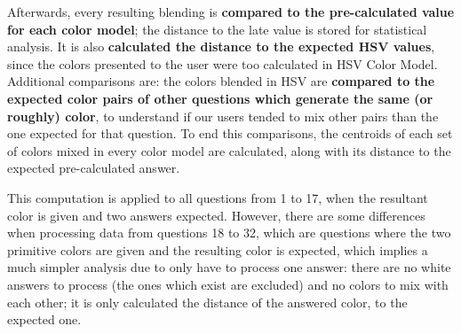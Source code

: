 %
Afterwards, every resulting blending is \textbf{compared to the pre-calculated value for each color model}; the distance to the late value is stored for statistical analysis. It is
also \textbf{calculated the distance to the expected HSV values}, since the colors presented to the user were too calculated in HSV Color Model. Additional comparisons are: the colors
blended in HSV are \textbf{compared to the expected color pairs of other questions which generate the same (or roughly) color}, to understand if our users tended to mix other pairs
than the one expected for that question. To end this comparisons, the centroids of each set of colors mixed in every color model are calculated, along with its distance to the expected
pre-calculated answer. \par
%
This computation is applied to all questions from 1 to 17, when the resultant color is given and two answers expected. However, there are some differences when processing
data from questions 18 to 32, which are questions where the two primitive colors are given and the resulting color is expected, which implies a much simpler analysis due to only have to
process one answer: there are no white answers to process (the ones which exist are excluded) and no colors to mix with each other; it is only calculated the distance of the
answered color, to the expected one. \par
%
